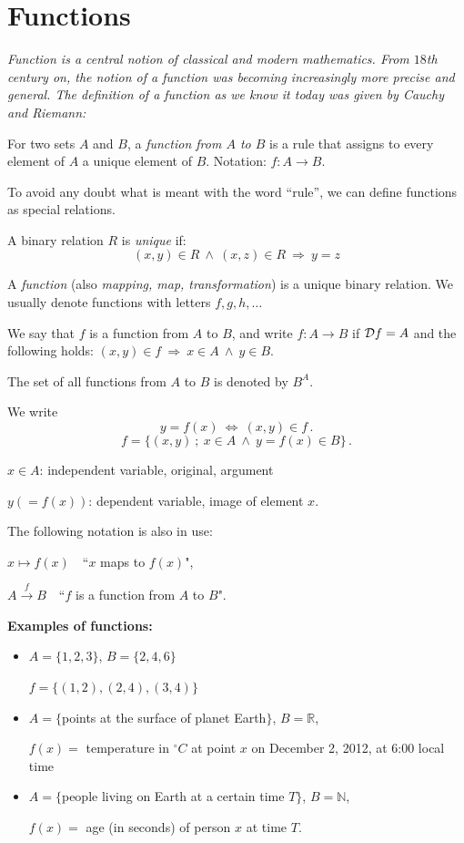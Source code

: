 \documentclass[11pt,paper=b5,footinclude,headinclude]{scrbook} %
\def\inn {{~\wedge~}}
\def\sledi {{~\Rightarrow~}}
\def\cee {{~\Leftrightarrow~}}
\theoremstyle{remark}
\theoremstyle{definition} %
\theoremstyle{theorem} %
\begin{document}
\section{Functions}

{\em Function is a central notion of classical and modern mathematics.
From $18$th century on, the notion of a function was becoming increasingly
more precise and general. The definition of a function as we know it today was given by Cauchy and Riemann:}

\medskip
For two sets $A$ and $B$, a {\em function from $A$ to $B$} is a rule that assigns to every element of $A$ a unique element of $B$.
Notation: $f:A\to B$.

\medskip
To avoid any doubt what is meant with the word ``rule'', we can define functions as special relations.

\medskip
A binary relation $R$ is {\em unique} if:
$$(x,y)\in R \inn (x,z)\in R\sledi y = z$$

A {\em function} (also {\em mapping, map, transformation})
is a unique binary relation. We usually denote functions with letters $f, g,h,\ldots$

We say that $f$ is a function from $A$ to $B$, and write $f:A\to B$ if ${\cal D}f= A$ and the following holds: $(x,y)\in f\sledi x\in A\inn y\in B$.

The set of all functions from $A$ to $B$ is denoted by $B^A$.

We write
$$y=f(x)\cee (x,y)\in f\,.$$
$$f = \{(x,y)~;~x\in A\inn y = f(x)\in B\}\,.$$

$x\in A$: independent variable, original, argument

$y (= f(x))$: dependent variable, image of element $x$.

\medskip

The following notation is also in use:

$x\mapsto f(x)$~~``$x$ maps to  $f(x)$",

$A\overset{f}{\to} B$~~``$f$ is a function from $A$ to $B$".

\bigskip
\textbf{ Examples of functions:}
\begin{itemize}
  \item $A = \{1,2,3\}$, $B = \{2,4,6\}$

  $f = \{(1,2),(2,4),(3,4)\}$

  \item $A = \{$points at the surface of planet Earth$\}$, $B = \mathbb{R}$,

$f(x) = $ temperature in  $^\circ C$ at point $x$ on December 2, 2012, at 6:00 local time

  \item $A = \{$people living on Earth at a certain time $T\}$, $B = \mathbb{N}$,

$f(x) = $ age (in seconds) of person $x$ at time $T$.
\end{itemize}
\end{document}
